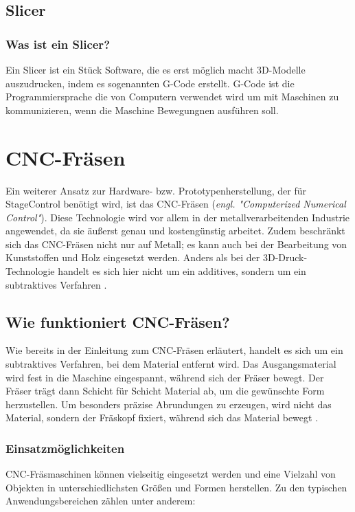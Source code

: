 \subsection{Slicer}
\subsubsection{Was ist ein Slicer?}
Ein Slicer ist ein Stück Software, die es erst möglich macht 3D-Modelle auszudrucken, indem es sogenannten G-Code erstellt. G-Code ist die Programmiersprache die von Computern verwendet wird um mit Maschinen zu kommunizieren, wenn die Maschine Bewegungnen ausführen soll. 
\cite{Slicer_G-Code}


\section{CNC-Fräsen}

Ein weiterer Ansatz zur Hardware- bzw. Prototypenherstellung, der für StageControl benötigt wird, ist das CNC-Fräsen (\emph{engl. "Computerized Numerical Control"}). Diese Technologie wird vor allem in der metallverarbeitenden Industrie angewendet, da sie äußerst genau und kostengünstig arbeitet. Zudem beschränkt sich das CNC-Fräsen nicht nur auf Metall; es kann auch bei der Bearbeitung von Kunststoffen und Holz eingesetzt werden. Anders als bei der 3D-Druck-Technologie handelt es sich hier nicht um ein additives, sondern um ein subtraktives Verfahren \cite{CNC-Fräsen} \cite{CNC-Fräsen_2} \cite{CNC-Fräsen_3}.

\subsection{Wie funktioniert CNC-Fräsen?}
Wie bereits in der Einleitung zum CNC-Fräsen erläutert, handelt es sich um ein subtraktives Verfahren, bei dem Material entfernt wird. Das Ausgangsmaterial wird fest in die Maschine eingespannt, während sich der Fräser bewegt. Der Fräser trägt dann Schicht für Schicht Material ab, um die gewünschte Form herzustellen. Um besonders präzise Abrundungen zu erzeugen, wird nicht das Material, sondern der Fräskopf fixiert, während sich das Material bewegt \cite{CNC-Fräsen_2} \cite{CNC-Fräsen_3}.

\subsubsection{Einsatzmöglichkeiten}
CNC-Fräsmaschinen können vielseitig eingesetzt werden und eine Vielzahl von Objekten in unterschiedlichsten Größen und Formen herstellen. Zu den typischen Anwendungsbereichen zählen unter anderem:

